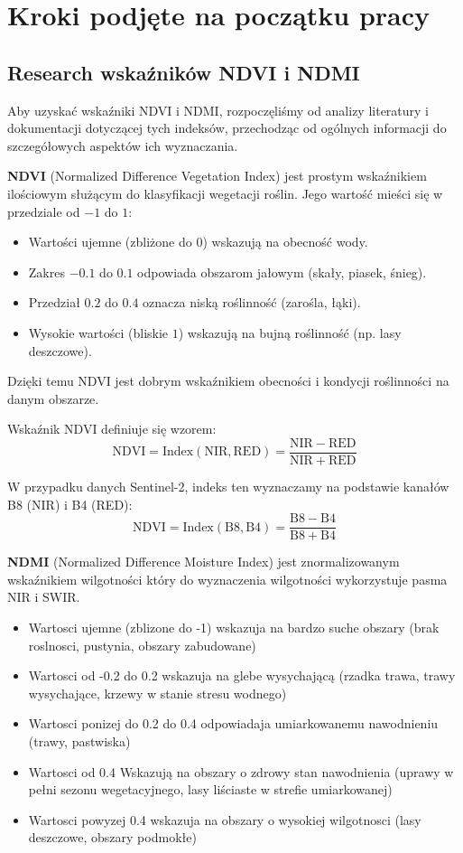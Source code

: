 \documentclass[12pt,a4paper]{article}
\begin{document}
\newpage

\section{Kroki podjęte na początku pracy}

\subsection{Research wskaźników NDVI i NDMI}

Aby uzyskać wskaźniki NDVI i NDMI, rozpoczęliśmy od analizy literatury i dokumentacji dotyczącej tych indeksów, przechodząc od ogólnych informacji do szczegółowych aspektów ich wyznaczania.

\textbf{NDVI} (Normalized Difference Vegetation Index) \cite{ndvi_docs} jest prostym wskaźnikiem ilościowym służącym do klasyfikacji wegetacji roślin. Jego wartość mieści się w przedziale od $-1$ do $1$:
\begin{itemize}
    \item Wartości ujemne (zbliżone do $0$) wskazują na obecność wody.
    \item Zakres $-0.1$ do $0.1$ odpowiada obszarom jałowym (skały, piasek, śnieg).
    \item Przedział $0.2$ do $0.4$ oznacza niską roślinność (zarośla, łąki).
    \item Wysokie wartości (bliskie $1$) wskazują na bujną roślinność (np. lasy deszczowe).
\end{itemize}

Dzięki temu NDVI jest dobrym wskaźnikiem obecności i kondycji roślinności na danym obszarze.

Wskaźnik NDVI definiuje się wzorem:
\[
\mathrm{NDVI} = \mathrm{Index}(\mathrm{NIR}, \mathrm{RED}) = \frac{\mathrm{NIR} - \mathrm{RED}}{\mathrm{NIR} + \mathrm{RED}}
\]

W przypadku danych Sentinel-2, indeks ten wyznaczamy na podstawie kanałów B8 (NIR) i B4 (RED):
\[
\mathrm{NDVI} = \mathrm{Index}(\mathrm{B8}, \mathrm{B4}) = \frac{\mathrm{B8} - \mathrm{B4}}{\mathrm{B8} + \mathrm{B4}}
\]

\textbf{NDMI} (Normalized Difference Moisture Index) \cite{ndmi_docs} jest znormalizowanym wskaźnikiem wilgotności który do wyznaczenia wilgotności wykorzystuje pasma NIR i SWIR.
\begin{itemize}
    \item Wartosci ujemne (zblizone do -1) wskazuja na bardzo suche obszary (brak roslnosci, pustynia, obszary zabudowane)
    \item Wartosci od -0.2 do 0.2 wskazuja na glebe wysychającą (rzadka trawa, trawy wysychające, krzewy w stanie stresu wodnego)
    \item Wartosci ponizej do 0.2 do 0.4 odpowiadaja umiarkowanemu nawodnieniu (trawy, pastwiska)
    \item Wartosci od 0.4  Wskazują na obszary o zdrowy stan nawodnienia (uprawy w pełni sezonu wegetacyjnego, lasy liściaste w strefie umiarkowanej) 
    \item Wartosci powyzej 0.4 wskazuja na obszary o wysokiej wilgotnosci (lasy deszczowe, obszary podmokłe)
\end{itemize}
\end{document}
